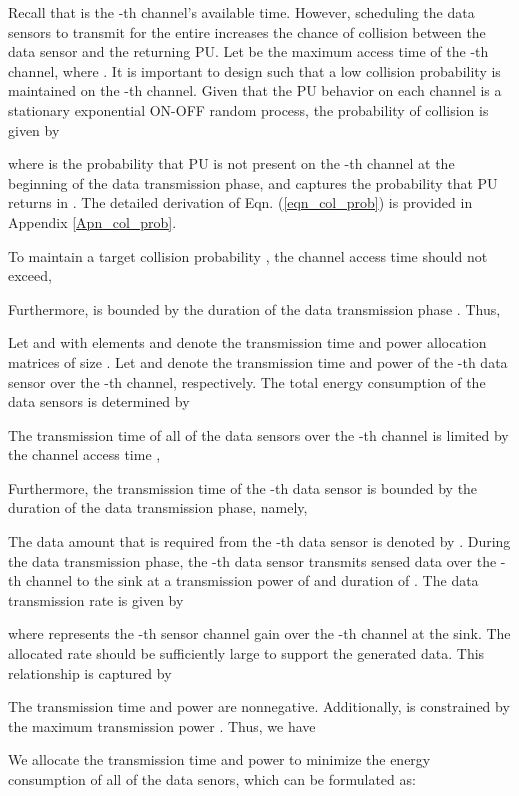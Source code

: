 \documentclass[journal]{IEEEtran} \ifCLASSINFOpdf
\begin{document}
Recall that  is the -th channel's available time. However, scheduling the data sensors to transmit for the entire  increases the chance of collision between the data sensor and the returning PU. Let  be the maximum access time of the -th channel, where . It is important to design  such that a low collision probability  is maintained on the -th channel. Given that the PU behavior on each channel is a stationary exponential ON-OFF random process, the probability of collision  is given by \cite{Kim2008}


where  is the probability that PU is not present on the -th channel at the beginning of the data transmission phase, and  captures the probability that PU returns in . The detailed derivation of Eqn. (\ref{eqn_col_prob}) is provided in Appendix \ref{Apn_col_prob}.





To maintain a target collision probability , the channel access time should not exceed,

Furthermore,  is bounded by the duration of the data transmission phase . Thus,


Let  and  with elements  and  denote the transmission time and power allocation matrices of size . Let  and  denote the transmission time and power of the -th data sensor over the -th channel, respectively. The total energy consumption of the data sensors is determined by

The transmission time of all of the data sensors over the -th channel is limited by the channel access time ,

Furthermore, the transmission time of the -th data sensor is bounded by the duration of the data transmission phase, namely,


The data amount that is required from the -th data sensor is denoted by . During the data transmission phase, the -th data sensor transmits sensed data over the -th channel to the sink at a transmission power of  and duration of . The data transmission rate is given by

where  represents the -th sensor channel gain over the -th channel at the sink. The allocated rate should be sufficiently large to support the generated data. This relationship is captured by

The transmission time  and power  are nonnegative. Additionally,  is constrained by the maximum transmission power . Thus, we have


We allocate the transmission time  and power  to minimize the energy consumption of all of the data senors, which can be formulated as:
\end{document}

